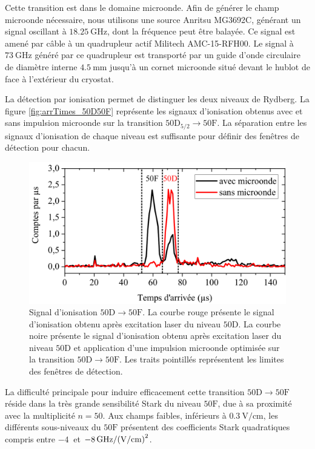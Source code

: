 Cette transition est dans le domaine microonde.
Afin de générer le champ microonde nécessaire, nous utilisons une source Anritsu MG3692C, générant un signal oscillant à $\SI{18.25}{\GHz}$, dont la fréquence peut être balayée.
Ce signal est amené par câble à un quadrupleur actif Militech AMC-15-RFH00.
Le signal à $\SI{73}{\GHz}$ généré par ce quadrupleur est transporté par un guide d'onde circulaire de diamètre interne $\SI{4.5}{\mm}$ jusqu'à un cornet microonde situé devant le hublot de face à l'extérieur du cryostat.

La détection par ionisation permet de distinguer les deux niveaux de Rydberg.
La figure \eqref{fig:arrTimes_50D50F} représente les signaux d'ionisation obtenus avec et sans impulsion microonde sur la transition $\mathrm{50D_{5/2} \rightarrow 50F}$.
La séparation entre les signaux d'ionisation de chaque niveau est suffisante pour définir des fenêtres de détection pour chacun.

\begin{figure}[!h]
\centering
\includegraphics[width=0.85\linewidth]{figures/circulars/arrTimes_50D50F}
\caption[Signal d'ionisation $\mathrm{50D\rightarrow 50F}$]{
Signal d'ionisation $\mathrm{50D\rightarrow 50F}$.
La courbe rouge présente le signal d'ionisation obtenu après excitation laser du niveau $\mathrm{50D}$.
La courbe noire présente le signal d'ionisation obtenu après excitation laser du niveau $\mathrm{50D}$ et application d'une impulsion microonde optimisée sur la transition $\mathrm{50D \rightarrow 50F}$.
Les traits pointillés représentent les limites des fenêtres de détection.
}
\label{fig:arrTimes_50D50F}
\end{figure}

La difficulté principale pour induire efficacement cette transition $\mathrm{50D} \rightarrow\mathrm{50F}$ réside dans la très grande sensibilité Stark du niveau $\mathrm{50F}$, due à sa proximité avec la multiplicité $n=50$.
Aux champs faibles, inférieurs à $\SI{0.3}{\V/\cm}$, les différents sous-niveaux du $\mathrm{50F}$ présentent des coefficients Stark quadratiques compris entre $\SI {-4}{}$ et $\SI{-8}{\GHz/(\V/\cm)\squared}$.

